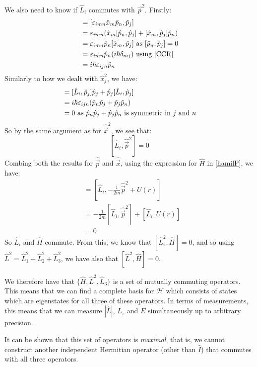 \documentclass[../main.tex]{subfiles}
\begin{document}
We also need to know if $\hat{L}_i$ commutes with $\vec{p}^2$.
Firstly:
\begin{align*}
  [\hat{L}_i, \hat{p}_j] &= [\levi_{i m n} \hat{x}_m \hat{p}_n, \hat{p}_j] \\
                         &= \levi_{i m n} (\hat{x}_m [\hat{p}_n, \hat{p}_j] + [\hat{x}_m, \hat{p}_j]\hat{p}_n) \\
                         &= \levi_{i m n} \hat{p}_n [\hat{x}_m, \hat{p}_j] \text{ as $[\hat{p}_n, \hat{p}_j] = 0$} \\
                         &= \levi_{i m n} \hat{p}_n (i\hbar \delta_{m j}) \text{ using \cref{CCR}} \\
                         &= i\hbar \levi_{i j n} \hat{p}_n
\end{align*}
Similarly to how we dealt with $\hat{x}^2_j$, we have:
\begin{align*}
  [\hat{L}_i, \hat{p}^2_j] &= [\hat{L}_i, \hat{p}_j]\hat{p}_j + \hat{p}_j[\hat{L}_i, \hat{p}_j] \\
                           &= i\hbar \levi_{i j n} (\hat{p}_n\hat{p}_j + \hat{p}_j \hat{p}_n) \\
                           &= 0 \text{ as $\hat{p}_n \hat{p}_j + \hat{p}_j \hat{p}_n$ is symmetric in $j$ and $n$}
\end{align*}
So by the same argument as for $\hat{\vec{x}}^2$, we see that:
\[
  [\hat{L}_i, \hat{\vec{p}}^2] = 0
\]
Combing both the results for $\hat{\vec{p}}$ and $\hat{\vec{x}}$, using the expression for $\hat{H}$ in \cref{hamilP}, we have:
\begin{align*}
  [\hat{L}_i, \hat{H}] &= \left[\hat{L}_i, -\frac{1}{2m} \hat{\vec{p}}^2 + U(r)\right] \\
                       &= -\frac{1}{2m} [\hat{L}_i, \hat{\vec{p}}^2] +  [\hat{L}_i, U(r)] \\
                       &= 0
\end{align*}
So $\hat{L}_i$ and $\hat{H}$ commute.
From this, we know that $[\hat{L}^2_i, \hat{H}] = 0$, and so using $\hat{L}^2 = \hat{L}^2_1 + \hat{L}^2_2 + \hat{L}^2_3$, we have also that $[\hat{L}^2, \hat{H}] = 0$.

We therefore have that $\{\hat{H}, \hat{L}^2, \hat{L}_3\}$ is a set of mutually commuting operators.
This means that we can find a complete basis for $\mathcal{H}$ which consists of states which are eigenstates for all three of these operators.
In terms of measurements, this means that we can measure $|\hat{L}|$, $L_z$ and $E$ simultaneously up to arbitrary precision.
\begin{remark}
  It can be shown that this set of operators is \textit{maximal}, that is, we cannot construct another independent Hermitian operator (other than $\hat{I}$) that commutes with all three operators.
\end{remark}
\end{document}
